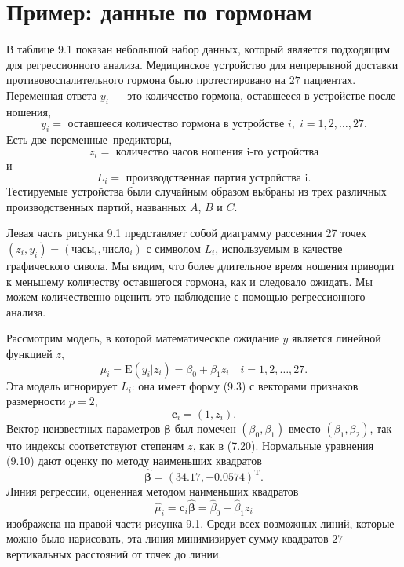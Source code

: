 \section{Пример: данные по гормонам}

В таблице 9.1 показан небольшой набор данных, который является подходящим для регрессионного анализа. Медицинское устройство для непрерывной доставки противовоспалительного гормона было протестировано на $27$ пациентах. Переменная ответа $y_i$ --- это количество гормона, оставшееся в устройстве после ношения,
$$y_i = \text{ оставшееся количество гормона в устройстве } i, \; i = 1, 2, \ldots, 27.$$
Есть две переменные--предикторы,
$$z_i = \text{ количество часов ношения i-го устройства}$$
и
$$L_i = \text{ производственная партия устройства i}.$$
Тестируемые устройства были случайным образом выбраны из трех различных производственных партий, названных $A$, $B$ и $C$.

Левая часть рисунка 9.1 представляет собой диаграмму рассеяния 27 точек $(z_i, y_i) = (\text{часы}_i, \text{число}_i)$ с символом $L_i$, используемым в качестве графического сивола. Мы видим, что более длительное время ношения приводит к меньшему количеству оставшегося гормона, как и следовало ожидать. Мы можем количественно оценить это наблюдение с помощью регрессионного анализа.

Рассмотрим модель, в которой математическое ожидание $y$ является линейной функцией $z$,
\begin{equation}
	\mu_i = \text{E}(y_i|z_i) = \beta_0 + \beta_1 z_i \quad i = 1,2, \ldots, 27.
\end{equation}
Эта модель игнорирует $L_i$: она имеет форму (9.3) с векторами признаков размерности $p = 2$,
\begin{equation}
	\textbf{c}_i = (1, z_i).
\end{equation}
Вектор неизвестных параметров $\bm{\beta}$ был помечен $(\beta_0, \beta_1)$ вместо $(\beta_1, \beta_2)$, так что индексы соответствуют степеням $z$, как в (7.20). Нормальные уравнения (9.10) дают оценку по методу наименьших квадратов
\begin{equation}
	\hat{\bm{\beta}} = (34.17, -0.0574)^\text{T}.
\end{equation}
Линия регрессии, оцененная методом наименьших квадратов
\begin{equation}
	\hat{\mu}_i = \textbf{c}_i \hat{\bm{\beta}} = \hat{\beta}_0 + \hat{\beta}_1 z_i
\end{equation}
изображена на правой части рисунка 9.1. Среди всех возможных линий, которые можно было нарисовать, эта линия минимизирует сумму квадратов $27$ вертикальных расстояний от точек до линии.


